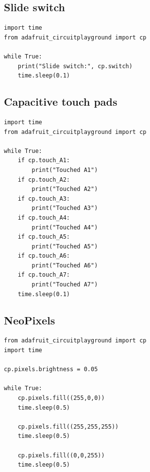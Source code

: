 \documentclass[11pt]{article}
\begin{document}
\subsection{Slide switch}

\begin{lstlisting}
import time
from adafruit_circuitplayground import cp

while True:
    print("Slide switch:", cp.switch)
    time.sleep(0.1)
\end{lstlisting}

\subsection{Capacitive touch pads}


\begin{lstlisting}
import time
from adafruit_circuitplayground import cp

while True:
    if cp.touch_A1:
        print("Touched A1")
    if cp.touch_A2:
        print("Touched A2")
    if cp.touch_A3:
        print("Touched A3")
    if cp.touch_A4:
        print("Touched A4")
    if cp.touch_A5:
        print("Touched A5")
    if cp.touch_A6:
        print("Touched A6")
    if cp.touch_A7:
        print("Touched A7")
    time.sleep(0.1)
\end{lstlisting}

\subsection{NeoPixels}

\begin{lstlisting}
from adafruit_circuitplayground import cp
import time

cp.pixels.brightness = 0.05

while True:
    cp.pixels.fill((255,0,0))
    time.sleep(0.5)
    
    cp.pixels.fill((255,255,255))
    time.sleep(0.5)
    
    cp.pixels.fill((0,0,255))
    time.sleep(0.5)
\end{lstlisting}
\end{document}
